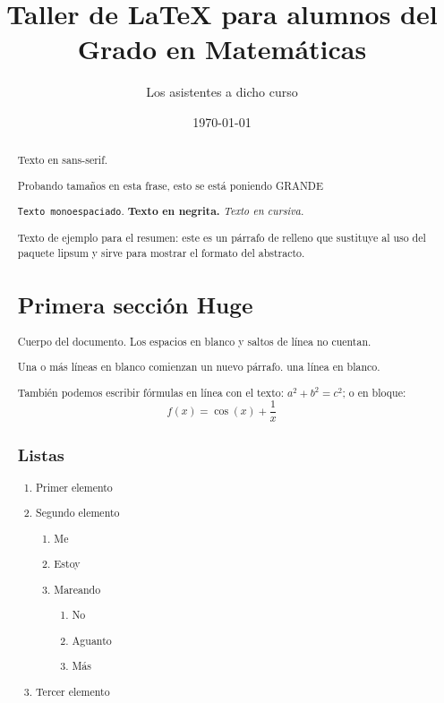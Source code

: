 \documentclass{article}
\title{Taller de \LaTeX{} para alumnos del Grado en Matemáticas}
\author{Los asistentes a dicho curso}
\date{\today}
\begin{document}
\maketitle

\tableofcontents

\begin{abstract}
\begin{abstract}
\textsf{Texto en sans-serif.} 

{\tiny Probando} {\scriptsize tamaños} {\footnotesize{en}} {\small esta} {\normalsize frase,} {\large esto} {\Large se} {\LARGE está} {\huge poniendo} {\Huge GRANDE}

\texttt{Texto monoespaciado}. \textbf{Texto en negrita.} \textit{Texto en cursiva.}

    Texto de ejemplo para el resumen: este es un párrafo de relleno que sustituye al uso del paquete lipsum y sirve para mostrar el formato del abstracto.
\end{abstract}
\section{Primera sección \Huge{Huge}}



Cuerpo del documento. Los       espacios en        blanco  y 
saltos de línea      no cuentan. 


Una o más líneas en blanco comienzan un nuevo párrafo.
una línea en blanco. 

También podemos escribir fórmulas en línea con el texto: $a^2+b^2=c^2$; o en bloque:
\[
f(x)=\cos(x)+\frac{1}{x}
\]

\subsection{Listas}
\begin{enumerate}
    \item Primer elemento
    \item Segundo elemento
    \begin{enumerate}
        \item Me
        \item Estoy
        \item Mareando
        \begin{enumerate}
            \item No
            \item Aguanto
            \item Más
        \end{enumerate}
    \end{enumerate}
    \item Tercer elemento
\end{enumerate}


\end{abstract}
\end{document}
